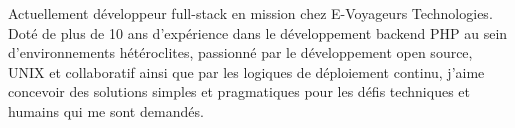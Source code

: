 

\begin{cvparagraph}

Actuellement développeur full-stack en mission chez E-Voyageurs Technologies. \newline
Doté de plus de 10 ans d'expérience dans le développement backend PHP au sein d'environnements hétéroclites, passionné par le développement open source, UNIX et collaboratif ainsi que par les logiques de déploiement continu, j'aime concevoir des solutions simples et pragmatiques pour les défis techniques et humains qui me sont demandés.
\end{cvparagraph}
